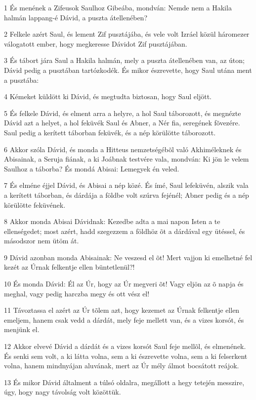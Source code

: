 \par 1 És menének a Zifeusok Saulhoz Gibeába, mondván: Nemde nem a Hakila halmán lappang-é Dávid, a puszta átellenében?
\par 2 Felkele azért Saul, és lement Zif pusztájába, és vele volt Izráel közül háromezer válogatott ember, hogy megkeresse Dávidot Zif pusztájában.
\par 3 És tábort jára Saul a Hakila halmán, mely a puszta átellenében van, az úton; Dávid pedig a pusztában tartózkodék. És mikor észrevette, hogy Saul utána ment a pusztába:
\par 4 Kémeket küldött ki Dávid, és megtudta biztosan, hogy Saul eljött.
\par 5 És felkele Dávid, és elment arra a helyre, a hol Saul táborozott, és megnézte Dávid azt a helyet, a hol feküvék Saul és Abner, a Nér fia, seregének fõvezére. Saul pedig a kerített táborban feküvék, és a nép körülötte táborozott.
\par 6 Akkor szóla Dávid, és monda a Hitteus nemzetségébõl való Akhiméleknek és Abisainak, a Seruja fiának, a ki Joábnak testvére vala, mondván: Ki jön le velem Saulhoz a táborba? És mondá Abisai: Lemegyek én veled.
\par 7 És elméne éjjel Dávid, és Abisai a nép közé. És ímé, Saul lefeküvén, alszik vala a kerített táborban, és dárdája a földbe volt szúrva fejénél; Abner pedig és a nép körülötte feküvének.
\par 8 Akkor monda Abisai Dávidnak: Kezedbe adta a mai napon Isten a te ellenségedet; most azért, hadd szegezzem a földhöz õt a dárdával egy ütéssel, és másodszor nem ütöm át.
\par 9 Dávid azonban monda Abisainak: Ne veszesd el õt! Mert vajjon ki emelhetné fel kezét az Úrnak felkentje ellen büntetlenül?!
\par 10 És monda Dávid: Él az Úr, hogy az Úr megveri õt! Vagy eljön az õ napja és meghal, vagy pedig harczba megy és ott vész el!
\par 11 Távoztassa el azért az Úr tõlem azt, hogy kezemet az Úrnak felkentje ellen emeljem, hanem csak vedd a dárdát, mely feje mellett van, és a vizes korsót, és menjünk el.
\par 12 Akkor elvevé Dávid a dárdát és a vizes korsót Saul feje mellõl, és elmenének. És senki sem volt, a ki látta volna, sem a ki észrevette volna, sem a ki felserkent volna, hanem mindnyájan aluvának, mert az Úr mély álmot bocsátott reájok.
\par 13 És mikor Dávid általment a túlsó oldalra, megállott a hegy tetején messzire, úgy, hogy nagy távolság volt közöttük.
